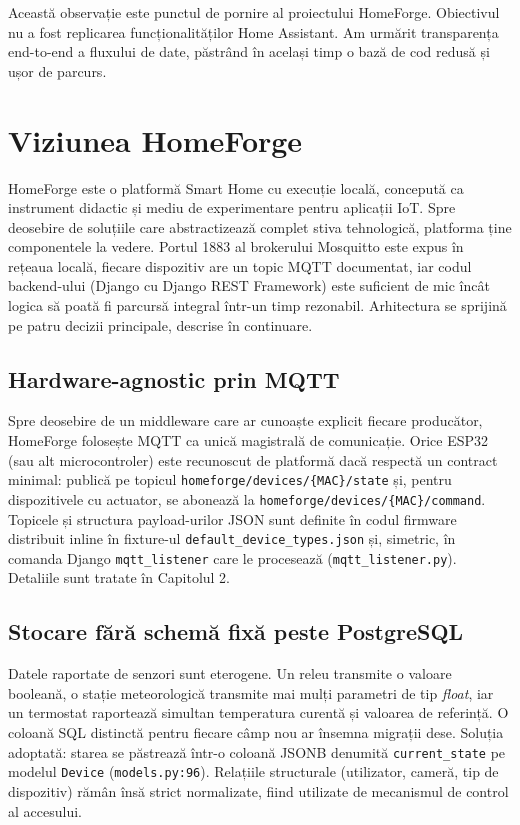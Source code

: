 Această observație este punctul de pornire al proiectului HomeForge. Obiectivul nu a fost replicarea funcționalităților Home Assistant. Am urmărit transparența end-to-end a fluxului de date, păstrând în același timp o bază de cod redusă și ușor de parcurs.

\section*{Viziunea HomeForge}
HomeForge este o platformă Smart Home cu execuție locală, concepută ca instrument didactic și mediu de experimentare pentru aplicații IoT. Spre deosebire de soluțiile care abstractizează complet stiva tehnologică, platforma ține componentele la vedere. Portul 1883 al brokerului Mosquitto este expus în rețeaua locală, fiecare dispozitiv are un topic MQTT documentat, iar codul backend-ului (Django cu Django REST Framework) este suficient de mic încât logica să poată fi parcursă integral într-un timp rezonabil. Arhitectura se sprijină pe patru decizii principale, descrise în continuare.

\subsection*{Hardware-agnostic prin MQTT}
Spre deosebire de un middleware care ar cunoaște explicit fiecare producător, HomeForge folosește MQTT ca unică magistrală de comunicație. Orice ESP32 (sau alt microcontroler) este recunoscut de platformă dacă respectă un contract minimal: publică pe topicul \texttt{homeforge/devices/\{MAC\}/state} și, pentru dispozitivele cu actuator, se abonează la \texttt{homeforge/devices/\{MAC\}/command}. Topicele și structura payload-urilor JSON sunt definite în codul firmware distribuit inline în fixture-ul \texttt{default\_device\_types.json} și, simetric, în comanda Django \texttt{mqtt\_listener} care le procesează (\texttt{mqtt\_listener.py}). Detaliile sunt tratate în Capitolul 2.

\subsection*{Stocare fără schemă fixă peste PostgreSQL}
Datele raportate de senzori sunt eterogene. Un releu transmite o valoare booleană, o stație meteorologică transmite mai mulți parametri de tip \textit{float}, iar un termostat raportează simultan temperatura curentă și valoarea de referință. O coloană SQL distinctă pentru fiecare câmp nou ar însemna migrații dese. Soluția adoptată: starea se păstrează într-o coloană JSONB denumită \texttt{current\_state} pe modelul \texttt{Device} (\texttt{models.py:96}). Relațiile structurale (utilizator, cameră, tip de dispozitiv) rămân însă strict normalizate, fiind utilizate de mecanismul de control al accesului.

